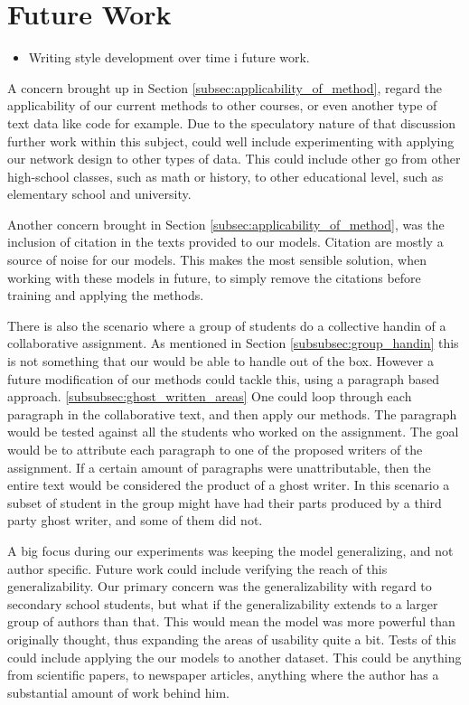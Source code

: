 \section{Future Work} \label{sec:future_work}


\begin{itemize}

    \item Writing style development over time i future work.

\end{itemize}

A concern brought up in Section \ref{subsec:applicability_of_method}, regard
the applicability of our current methods to other courses, or even another
type of text data like code for example. Due to the speculatory nature of that
discussion further work within this subject, could well include experimenting
with applying our network design to other types of data. This could include
other go from other high-school classes, such as math or history, to other
educational level, such as elementary school and university.

Another concern brought in Section \ref{subsec:applicability_of_method}, was
the inclusion of citation in the texts provided to our models. Citation are
mostly a source of noise for our models. This makes the most sensible solution,
when working with these models in future, to simply remove the citations before
training and applying the methods.

There is also the scenario where a group of students do a collective handin of a
collaborative assignment. As mentioned in Section \ref{subsubsec:group_handin}
this is not something that our would be able to handle out of the box. However
a future modification of our methods could tackle this, using a paragraph based
approach. \ref{subsubsec:ghost_written_areas} One could loop through each
paragraph in the collaborative text, and then apply our methods. The paragraph
would be tested against all the students who worked on the assignment. The goal
would be to attribute each paragraph to one of the proposed writers of the
assignment. If a certain amount of paragraphs were unattributable, then the
entire text would be considered the product of a ghost writer. In this scenario
a subset of student in the group might have had their parts produced by a third
party ghost writer, and some of them did not.

A big focus during our experiments was keeping the model generalizing, and
not author specific. Future work could include verifying the reach of this
generalizability. Our primary concern was the generalizability with regard to
secondary school students, but what if the generalizability extends to a larger
group of authors than that. This would mean the model was more powerful than
originally thought, thus expanding the areas of usability quite a bit. Tests
of this could include applying the our models to another dataset. This could
be anything from scientific papers, to newspaper articles, anything where the
author has a substantial amount of work behind him.


